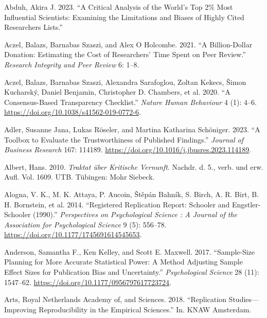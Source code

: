 \documentclass[
  letterpaper,
  DIV=11,
  numbers=noendperiod]{scrreprt}
\newlength{\cslhangindent}
\newenvironment{CSLReferences}[2] %
 {\begin{list}{}{%
  \setlength{\itemindent}{0pt}
  \setlength{\leftmargin}{0pt}
  \setlength{\parsep}{0pt}
  \ifodd #1
   \setlength{\leftmargin}{\cslhangindent}
   \setlength{\itemindent}{-1\cslhangindent}
  \fi
  \setlength{\itemsep}{#2\baselineskip}}}
 {\end{list}}
\begin{document}
\label{refs}
\begin{CSLReferences}{1}{0}
Abduh, Akira J. 2023. {``A Critical Analysis of the World's Top 2\% Most
Influential Scientists: Examining the Limitations and Biases of Highly
Cited Researchers Lists.''}

Aczel, Balazs, Barnabas Szaszi, and Alex O Holcombe. 2021. {``A
Billion-Dollar Donation: Estimating the Cost of Researchers' Time Spent
on Peer Review.''} \emph{Research Integrity and Peer Review} 6: 1--8.

Aczel, Balazs, Barnabas Szaszi, Alexandra Sarafoglou, Zoltan Kekecs,
Šimon Kucharský, Daniel Benjamin, Christopher D. Chambers, et al. 2020.
{``A Consensus-Based Transparency Checklist.''} \emph{Nature Human
Behaviour} 4 (1): 4--6. \url{https://doi.org/10.1038/s41562-019-0772-6}.

Adler, Susanne Jana, Lukas Röseler, and Martina Katharina Schöniger.
2023. {``A Toolbox to Evaluate the Trustworthiness of Published
Findings.''} \emph{Journal of Business Research} 167: 114189.
\url{https://doi.org/10.1016/j.jbusres.2023.114189}.

Albert, Hans. 2010. \emph{Traktat {ü}ber Kritische Vernunft}. Nachdr. d.
5., verb. und erw. Aufl. Vol. 1609. UTB. T{ü}bingen: {Mohr Siebeck}.

Alogna, V. K., M. K. Attaya, P. Aucoin, Štěpán Bahník, S. Birch, A. R.
Birt, B. H. Bornstein, et al. 2014. {``Registered Replication Report:
Schooler and Engstler-Schooler (1990).''} \emph{Perspectives on
Psychological Science : A Journal of the Association for Psychological
Science} 9 (5): 556--78. \url{https://doi.org/10.1177/1745691614545653}.

Anderson, Samantha F., Ken Kelley, and Scott E. Maxwell. 2017.
{``Sample-Size Planning for More Accurate Statistical Power: A Method
Adjusting Sample Effect Sizes for Publication Bias and Uncertainty.''}
\emph{Psychological Science} 28 (11): 1547--62.
\url{https://doi.org/10.1177/0956797617723724}.

Arts, Royal Netherlands Academy of, and Sciences. 2018. {``Replication
Studies---Improving Reproducibility in the Empirical Sciences.''} In.
KNAW Amsterdam.


\end{CSLReferences}
\end{document}
